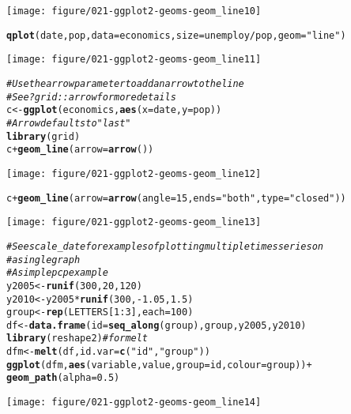 \documentclass[a4paper,titlepage]{tufte-handout}\usepackage[]{graphicx}\usepackage[]{color}
\makeatletter
\def\maxwidth{ %
  \ifdim\Gin@nat@width>\linewidth
    \linewidth
  \else
    \Gin@nat@width
  \fi
}
\newcommand{\hlnum}[1]{\textcolor[rgb]{0.686,0.059,0.569}{#1}}%
\newcommand{\hlstr}[1]{\textcolor[rgb]{0.192,0.494,0.8}{#1}}%
\newcommand{\hlcom}[1]{\textcolor[rgb]{0.678,0.584,0.686}{\textit{#1}}}%
\newcommand{\hlopt}[1]{\textcolor[rgb]{0,0,0}{#1}}%
\newcommand{\hlstd}[1]{\textcolor[rgb]{0.345,0.345,0.345}{#1}}%
\newcommand{\hlkwb}[1]{\textcolor[rgb]{0.69,0.353,0.396}{#1}}%
\newcommand{\hlkwc}[1]{\textcolor[rgb]{0.333,0.667,0.333}{#1}}%
\newcommand{\hlkwd}[1]{\textcolor[rgb]{0.737,0.353,0.396}{\textbf{#1}}}%
\newenvironment{kframe}{%
 \def\at@end@of@kframe{}%
 \ifinner\ifhmode%
  \def\at@end@of@kframe{\end{minipage}}%
  \begin{minipage}{\columnwidth}%
 \fi\fi%
 \def\FrameCommand##1{\hskip\@totalleftmargin \hskip-\fboxsep
 \colorbox{shadecolor}{##1}\hskip-\fboxsep
     \hskip-\linewidth \hskip-\@totalleftmargin \hskip\columnwidth}%
 \MakeFramed {\advance\hsize-\width
   \@totalleftmargin\z@ \linewidth\hsize
   \@setminipage}}%
 {\par\unskip\endMakeFramed%
 \at@end@of@kframe}
\newenvironment{knitrout}{}{} %
\makeatother
\begin{document}
\begin{knitrout}
\begin{kframe}
\begin{alltt}
\end{alltt}
\end{kframe}
\texttt{[image: figure/021-ggplot2-geoms-geom\_line10]} 
\begin{kframe}\begin{alltt}
\hlkwd{qplot}\hlstd{(date, pop,} \hlkwc{data}\hlstd{=economics,} \hlkwc{size}\hlstd{=unemploy}\hlopt{/}\hlstd{pop,} \hlkwc{geom}\hlstd{=}\hlstr{"line"}\hlstd{)}
\end{alltt}
\end{kframe}
\texttt{[image: figure/021-ggplot2-geoms-geom\_line11]} 
\begin{kframe}\begin{alltt}
\hlcom{# Use the arrow parameter to add an arrow to the line}
\hlcom{# See ?grid::arrow for more details}
\hlstd{c} \hlkwb{<-} \hlkwd{ggplot}\hlstd{(economics,} \hlkwd{aes}\hlstd{(}\hlkwc{x} \hlstd{= date,} \hlkwc{y} \hlstd{= pop))}
\hlcom{# Arrow defaults to "last"}
\hlkwd{library}\hlstd{(grid)}
\hlstd{c} \hlopt{+} \hlkwd{geom_line}\hlstd{(}\hlkwc{arrow} \hlstd{=} \hlkwd{arrow}\hlstd{())}
\end{alltt}
\end{kframe}
\texttt{[image: figure/021-ggplot2-geoms-geom\_line12]} 
\begin{kframe}\begin{alltt}
\hlstd{c} \hlopt{+} \hlkwd{geom_line}\hlstd{(}\hlkwc{arrow} \hlstd{=} \hlkwd{arrow}\hlstd{(}\hlkwc{angle} \hlstd{=} \hlnum{15}\hlstd{,} \hlkwc{ends} \hlstd{=} \hlstr{"both"}\hlstd{,} \hlkwc{type} \hlstd{=} \hlstr{"closed"}\hlstd{))}
\end{alltt}
\end{kframe}
\texttt{[image: figure/021-ggplot2-geoms-geom\_line13]} 
\begin{kframe}\begin{alltt}
\hlcom{# See scale_date for examples of plotting multiple times series on}
\hlcom{# a single graph}
\hlcom{# A simple pcp example}
\hlstd{y2005} \hlkwb{<-} \hlkwd{runif}\hlstd{(}\hlnum{300}\hlstd{,} \hlnum{20}\hlstd{,} \hlnum{120}\hlstd{)}
\hlstd{y2010} \hlkwb{<-} \hlstd{y2005} \hlopt{*} \hlkwd{runif}\hlstd{(}\hlnum{300}\hlstd{,} \hlopt{-}\hlnum{1.05}\hlstd{,} \hlnum{1.5}\hlstd{)}
\hlstd{group} \hlkwb{<-} \hlkwd{rep}\hlstd{(LETTERS[}\hlnum{1}\hlopt{:}\hlnum{3}\hlstd{],} \hlkwc{each} \hlstd{=} \hlnum{100}\hlstd{)}
\hlstd{df} \hlkwb{<-} \hlkwd{data.frame}\hlstd{(}\hlkwc{id} \hlstd{=} \hlkwd{seq_along}\hlstd{(group), group, y2005, y2010)}
\hlkwd{library}\hlstd{(reshape2)} \hlcom{# for melt}
\hlstd{dfm} \hlkwb{<-} \hlkwd{melt}\hlstd{(df,} \hlkwc{id.var} \hlstd{=} \hlkwd{c}\hlstd{(}\hlstr{"id"}\hlstd{,} \hlstr{"group"}\hlstd{))}
\hlkwd{ggplot}\hlstd{(dfm,} \hlkwd{aes}\hlstd{(variable, value,} \hlkwc{group} \hlstd{= id,} \hlkwc{colour} \hlstd{= group))} \hlopt{+}
  \hlkwd{geom_path}\hlstd{(}\hlkwc{alpha} \hlstd{=} \hlnum{0.5}\hlstd{)}
\end{alltt}
\end{kframe}
\texttt{[image: figure/021-ggplot2-geoms-geom\_line14]} 
\begin{kframe}\begin{alltt}



\end{alltt}
\end{kframe}
\end{knitrout}
\end{document}
